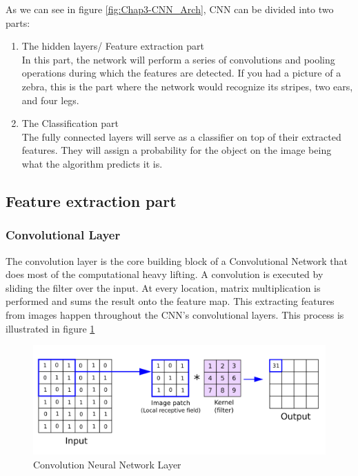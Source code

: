 As we can see in figure \ref{fig:Chap3-CNN_Arch}, CNN can be divided into two parts:
\begin{enumerate}
	\item The hidden layers/ Feature extraction part\\
	In this part, the network will perform a series of convolutions and pooling operations during which the features are detected. If you had a picture of a zebra, this is the part where the network would recognize its stripes, two ears, and four legs.
	\item The Classification part\\
	The fully connected layers will serve as a classifier on top of their extracted features. They will assign a probability for the object on the image being what the algorithm predicts it is.
\end{enumerate}

\subsection{Feature extraction part}
\subsubsection{Convolutional Layer}

The convolution layer is the core building block of a Convolutional Network that does most of the computational heavy lifting. A convolution is executed by sliding the filter over the input. At every location, matrix multiplication is performed and sums the result onto the feature map. This extracting features from images happen throughout the CNN's convolutional layers. This process is illustrated in figure \ref{fig:Chap3-CNN_Layer}

\begin{figure}[H]
	\centering
	\includegraphics[width=\textwidth]{img/Chap3/ConvLayer}
	\caption{Convolution Neural Network Layer}
	\label{fig:Chap3-CNN_Layer}
\end{figure}

